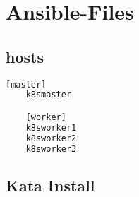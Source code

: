 \chapter{Ansible-Files}

\section{hosts}
\hfill \newline
\label{app:hosts_file}
\begin{lstlisting}[language=bash]
    [master]
    k8smaster

    [worker]
    k8sworker1
    k8sworker2
    k8sworker3    
\end{lstlisting}

\section{Kata Install}

